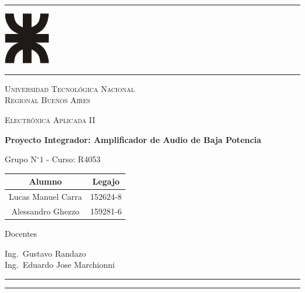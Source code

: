 \documentclass[12pt,a4paper]{report}
\begin{document}
\begin{titlepage}
	\pagestyle{fancy}
	\centering
			\textcolor{red}{\rule{15cm}{0.2mm}}\par \vspace{0.5cm}
	\includegraphics[width=0.15\textwidth]{utn}\par
		\textcolor{red}{\rule{15cm}{0.2mm}}
		\par\vspace{1cm}

	{\scshape\LARGE Universidad Tecnológica Nacional\\Regional Buenos Aires \par}
	\vspace{1cm}
	{\scshape\Large Electrónica Aplicada II\par}
	\vspace{1cm}
	{\huge\bfseries Proyecto Integrador: Amplificador de Audio de Baja Potencia\par}
	\vspace{1cm}
	\begin{flushleft}
	Grupo N$^{\circ} 1$ - Curso: R4053\\ \vspace{0.1cm}
	\begin{tabular}{ |c|c| } 
	 \hline
	 Alumno &  Legajo\\
	\hline
	 Lucas Manuel Carra &  152624-8\\
	 \hline
	 Alessandro Ghezzo &  159281-6\\
	 \hline
	\end{tabular}
	\vspace{2cm}
	\vfill
	Docentes\par
	Ing.~Gustavo Randazo\\
	Ing.~Eduardo Jose Marchionni\\
	\end{flushleft}
	\textcolor{red}{\rule{15cm}{0.2mm}}

\end{titlepage}
\tableofcontents
\vfill
\textcolor{red}{\rule{15cm}{0.2mm}}\par \vspace{0.5cm}
\end{document}
